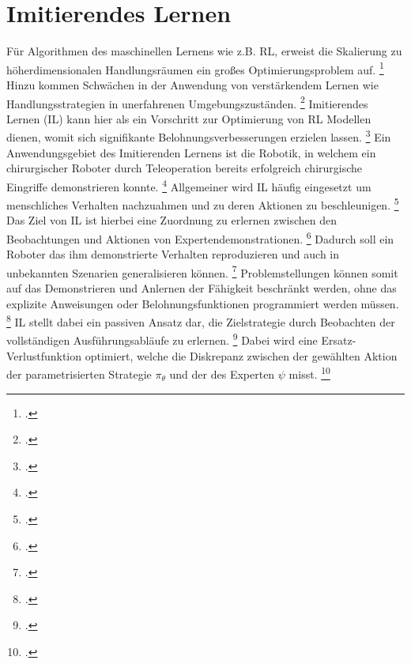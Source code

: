 \section{Imitierendes Lernen}

Für Algorithmen des maschinellen Lernens wie z.B. RL, erweist die Skalierung zu höherdimensionalen Handlungsräumen ein großes Optimierungsproblem auf. \footcite[Vgl.][S. 3]{Hussein.2017}
Hinzu kommen Schwächen in der Anwendung von verstärkendem Lernen wie Handlungsstrategien in unerfahrenen Umgebungszuständen. \footcite[Vgl.][S. 1]{attia.2018}
Imitierendes Lernen (IL) kann hier als ein Vorschritt zur Optimierung von RL Modellen dienen, womit sich signifikante Belohnungsverbesserungen erzielen lassen. \footcite[Vgl.][S. 4]{Hussein.2017}
Ein Anwendungsgebiet des Imitierenden Lernens ist die Robotik, in welchem ein chirurgischer Roboter durch Teleoperation bereits erfolgreich chirurgische Eingriffe demonstrieren konnte. \footcite[Vgl.][]{gao.2014}
Allgemeiner wird IL häufig eingesetzt um menschliches Verhalten nachzuahmen und zu deren Aktionen zu beschleunigen. \footcite[Vgl.][S. 1]{attia.2018}
Das Ziel von IL ist hierbei eine Zuordnung zu erlernen zwischen den Beobachtungen und Aktionen von Expertendemonstrationen. \footcite[Vgl.][S. 1]{Hussein.2017}
Dadurch soll ein Roboter das ihm demonstrierte Verhalten reproduzieren und auch in unbekannten Szenarien generalisieren können. \footcite[Vgl.][S. 365]{fang.2019}
Problemstellungen können somit auf das Demonstrieren und Anlernen der Fähigkeit beschränkt werden, ohne das explizite Anweisungen oder Belohnungsfunktionen programmiert werden müssen. \footcite[Vgl.][S. 1]{Hussein.2017}
IL stellt dabei ein passiven Ansatz dar, die Zielstrategie durch Beobachten der vollständigen Ausführungsabläufe zu erlernen. \footcite[Vgl.][S. 2]{attia.2018}
Dabei wird eine Ersatz-Verlustfunktion optimiert, welche die Diskrepanz zwischen der gewählten Aktion der parametrisierten Strategie $\pi_{\theta}$ und der des Experten $\psi$ misst. \footcite[Vgl.][S. 2f.]{Ashwin.2020}

